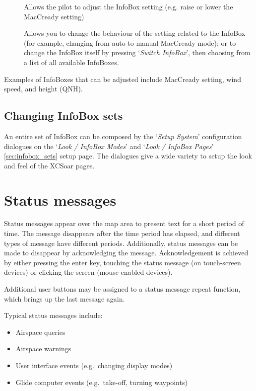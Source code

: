 \begin{description}
\item[]  
  Allows the pilot to adjust the InfoBox setting (e.g. raise or lower the 
  MacCready setting)

\item[]
  Allows you to change the behaviour of the setting related to the InfoBox 
  (for example, changing from auto to manual MacCready mode); or 
  to change the InfoBox itself by pressing `{\it Switch InfoBox}', then 
  choosing from a list of all available InfoBoxes.

\end{description}

Examples of InfoBoxes that can
be adjusted include MacCready setting, wind speed, and height (QNH).


\subsection*{Changing InfoBox sets}

An entire set of InfoBox can be composed by the `{\it Setup System}' configuration 
dialogues on the `{\it Look / InfoBox Modes}' and `{\it Look / InfoBox Pages}' 
\ref{sec:infobox_sets} setup page. 
The dialogues give a wide variety to setup the look and feel of the XCSoar pages.  


\section{Status messages}

Status messages appear over the map area to present text for a short period of
time.  The message disappears after the time period has elapsed, and different
types of message have different periods. Additionally, status messages can be
made to disappear by acknowledging the message.  Acknowledgement is achieved by
either pressing the enter key, touching the status
message (on touch-screen devices) or clicking the screen (mouse enabled devices).

Additional user buttons may be assigned to a status message repeat function,
which brings up the last message again.

Typical status messages include:
\begin{itemize}
\item Airspace queries
\item Airspace warnings
\item User interface events (e.g.\ changing display modes)
\item Glide computer events (e.g.\ take-off, turning waypoints)
\end{itemize}


